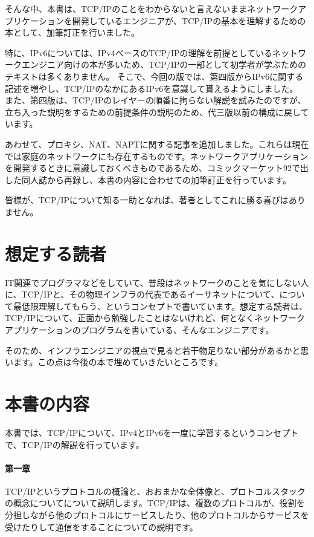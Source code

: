 そんな中、本書は、TCP/IPのことをわからないと言えないままネットワークアプリケーションを開発しているエンジニアが、TCP/IPの基本を理解するための本として、加筆訂正を行いました。

特に、IPv6については、IPv4ベースのTCP/IPの理解を前提としているネットワークエンジニア向けの本が多いため、TCP/IPの一部として初学者が学ぶためのテキストは多くありません。
そこで、今回の版では、第四版からIPv6に関する記述を増やし、TCP/IPのなかにあるIPv6を意識して貰えるようにしました。
また、第四版は、TCP/IPのレイヤーの順番に拘らない解説を試みたのですが、立ち入った説明をするための前提条件の説明のため、代三版以前の構成に戻しています。

あわせて、プロキシ、NAT、NAPTに関する記事を追加しました。これらは現在では家庭のネットワークにも存在するものです。ネットワークアプリケーションを開発するときに意識しておくべきものであるため、コミックマーケット92で出した同人誌から再録し、本書の内容に合わせての加筆訂正を行っています。

皆様が、TCP/IPについて知る一助となれば、著者としてこれに勝る喜びはありません。

\section*{想定する読者}
IT関連でプログラマなどをしていて、普段はネットワークのことを気にしない人に、TCP/IPと、その物理インフラの代表であるイーサネットについて、について最低限理解してもらう、というコンセプトで書いています。想定する読者は、TCP/IPについて、正面から勉強したことはないけれど、何となくネットワークアプリケーションのプログラムを書いている、そんなエンジニアです。

そのため、インフラエンジニアの視点で見ると若干物足りない部分があるかと思います。この点は今後の本で埋めていきたいところです。


\section*{本書の内容}
本書では、TCP/IPについて、IPv4とIPv6を一度に学習するというコンセプトで、TCP/IPの解説を行っています。

\paragraph{第一章}
TCP/IPというプロトコルの概論と、おおまかな全体像と、プロトコルスタックの概念についてについて説明します。TCP/IPは、複数のプロトコルが、役割を分担しながら他のプロトコルにサービスしたり、他のプロトコルからサービスを受けたりして通信をすることについての説明です。

